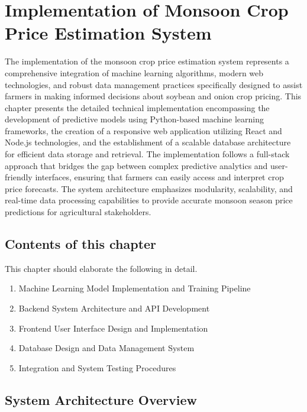 \chapter{Implementation of Monsoon Crop Price Estimation System}

The implementation of the monsoon crop price estimation system represents a comprehensive integration of machine learning algorithms, modern web technologies, and robust data management practices specifically designed to assist farmers in making informed decisions about soybean and onion crop pricing. This chapter presents the detailed technical implementation encompassing the development of predictive models using Python-based machine learning frameworks, the creation of a responsive web application utilizing React and Node.js technologies, and the establishment of a scalable database architecture for efficient data storage and retrieval. The implementation follows a full-stack approach that bridges the gap between complex predictive analytics and user-friendly interfaces, ensuring that farmers can easily access and interpret crop price forecasts. The system architecture emphasizes modularity, scalability, and real-time data processing capabilities to provide accurate monsoon season price predictions for agricultural stakeholders.

\section{Contents of this chapter}

This chapter should elaborate the following in detail.

\begin{enumerate}
\item Machine Learning Model Implementation and Training Pipeline
\item Backend System Architecture and API Development
\item Frontend User Interface Design and Implementation
\item Database Design and Data Management System
\item Integration and System Testing Procedures
\end{enumerate}

\vspace{0.75cm}

\section{System Architecture Overview}

